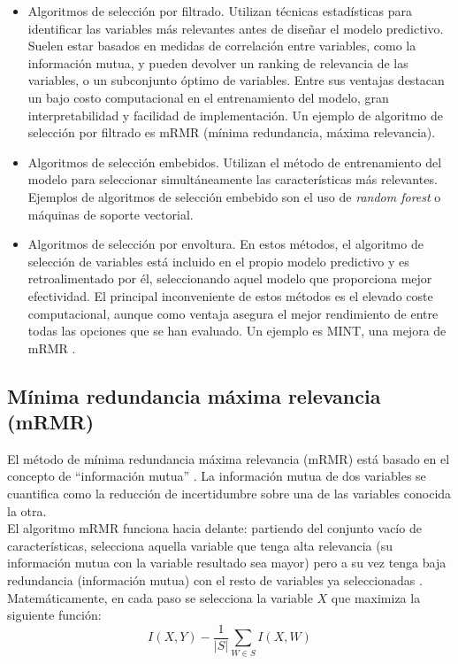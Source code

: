 \begin{itemize}
	\item Algoritmos de selección por filtrado. Utilizan técnicas estadísticas para identificar las variables más relevantes antes de diseñar el modelo predictivo. Suelen estar basados en medidas de correlación entre variables, como la información mutua, y pueden devolver un ranking de relevancia de las variables, o un subconjunto óptimo de variables. Entre sus ventajas destacan un bajo costo computacional en el entrenamiento del modelo, gran interpretabilidad y facilidad de implementación. Un ejemplo de algoritmo de selección por filtrado es mRMR (mínima redundancia, máxima relevancia). 
	
	\item Algoritmos de selección embebidos. Utilizan el método de entrenamiento del modelo para seleccionar simultáneamente las características más relevantes. Ejemplos de algoritmos de selección embebido son el uso de \textit{random forest} o máquinas de soporte vectorial. 
	
	\item Algoritmos de selección por envoltura. En estos métodos, el algoritmo de selección de variables está incluido en el propio modelo predictivo y es retroalimentado por él, seleccionando aquel modelo que proporciona mejor efectividad. El principal inconveniente de estos métodos es el elevado coste computacional, aunque como ventaja asegura el mejor rendimiento de entre todas las opciones que se han evaluado. Un ejemplo es MINT, una mejora de mRMR \cite{He2016}.
\end{itemize}

\subsection{Mínima redundancia máxima relevancia (mRMR)}

El método de mínima redundancia máxima relevancia (mRMR) está basado en el concepto de ``información mutua'' \cite{Koller1996}. La información mutua de dos variables se cuantifica como la reducción de incertidumbre sobre una de las variables conocida la otra.\\

El algoritmo mRMR funciona hacia delante: partiendo del conjunto vacío de características, selecciona aquella variable que tenga alta relevancia (su información mutua con la variable resultado sea mayor) pero a su vez tenga baja redundancia (información mutua) con el resto de variables ya seleccionadas \cite{HanchuanPeng2005}. Matemáticamente, en cada paso se selecciona la variable $X$ que maximiza la siguiente función: $$I(X,Y) - \dfrac{1}{\rvert S \rvert} \sum_{W\in S} I(X, W)$$

